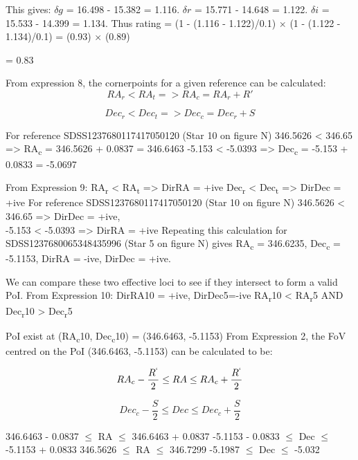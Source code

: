 \documentclass[]{elsarticle} %
\begin{document}
This gives: \(\delta g\) = 16.498 - 15.382 = 1.116. \(\delta r\) =
15.771 - 14.648 = 1.122. \(\delta i\) = 15.533 - 14.399 = 1.134. Thus
rating = (1 - (\textbar{}1.116 - 1.122)/0.1\textbar{}) \(\times\) (1 -
(\textbar{}1.122 - 1.134)/0.1\textbar{}) = (0.93) \(\times\) (0.89)

= 0.83

\newpage

From expression 8, the cornerpoints for a given reference can be
calculated: \[RA_r < RA_t => RA_c = RA_r + R'\]

\[Dec_r < Dec_t => Dec_c = Dec_r + S\]

For reference SDSS1237680117417050120 (Star 10 on figure N) \vskip 0.2in
346.5626 \textless{} 346.65 =\textgreater{} RA\textsubscript{c} =
346.5626 + 0.0837 = 346.6463 \vskip 0.2in -5.153 \textless{} -5.0393
=\textgreater{} Dec\textsubscript{c} = -5.153 + 0.0833 = -5.0697

From Expression 9: RA\textsubscript{r} \textless{} RA\textsubscript{t}
=\textgreater{} DirRA = +ive Dec\textsubscript{r} \textless{}
Dec\textsubscript{t} =\textgreater{} DirDec = +ive \vskip 0.2in For
reference SDSS1237680117417050120 (Star 10 on figure N) \vskip 0.2in
346.5626 \textless{} 346.65 =\textgreater{} DirDec = +ive,\\
-5.153 \textless{} -5.0393 =\textgreater{} DirRA = +ive \vskip 0.2in
Repeating this calculation for SDSS1237680065348435996 (Star 5 on figure
N) gives RA\textsubscript{c} = 346.6235, Dec\textsubscript{c} = -5.1153,
\vskip 0.2in DirRA = -ive, DirDec = +ive.

We can compare these two effective loci to see if they intersect to form
a valid PoI. \vskip 0.2in From Expression 10: DirRA10 = +ive,
DirDec5=-ive RA\textsubscript{r}10 \textless{} RA\textsubscript{r}5 AND
Dec\textsubscript{r}10 \textgreater{} Dec\textsubscript{r}5

PoI exist at (RA\textsubscript{c}10, Dec\textsubscript{c}10) =
(346.6463, -5.1153) \vskip 0.2in From Expression 2, the FoV centred on
the PoI (346.6463, -5.1153) can be calculated to be:

\[RA_c - {\frac{R^`}{2}} \leq RA \leq RA_c + {\frac{R^`}{2}} \]

\[Dec_c - {\frac{S}{2}} \leq Dec \leq Dec_c + {\frac{S}{2}}\]

346.6463 - 0.0837 \(\leq\) RA \(\leq\) 346.6463 + 0.0837 \vskip 0.2in
-5.1153 - 0.0833 \(\leq\) Dec \(\leq\) -5.1153 + 0.0833 \vskip 0.2in
346.5626 \(\leq\) RA \(\leq\) 346.7299 \vskip 0.2in -5.1987 \(\leq\) Dec
\(\leq\) -5.032 \newpage
\end{document}

